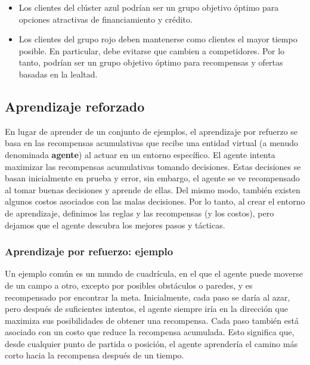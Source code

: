 \documentclass[
]{book}
\providecommand{\tightlist}{%
  \setlength{\itemsep}{0pt}\setlength{\parskip}{0pt}}
\begin{document}
\begin{itemize}
\tightlist
\item
  Los clientes del clúster azul podrían ser un grupo objetivo óptimo para opciones atractivas de financiamiento y crédito.
\item
  Los clientes del grupo rojo deben mantenerse como clientes el mayor tiempo posible. En particular, debe evitarse que cambien a competidores. Por lo tanto, podrían ser un grupo objetivo óptimo para recompensas y ofertas basadas en la lealtad.
\end{itemize}

\hypertarget{aprendizaje-reforzado}{%
\subsection{Aprendizaje reforzado}\label{aprendizaje-reforzado}}

En lugar de aprender de un conjunto de ejemplos, el aprendizaje por refuerzo se basa en las recompensas acumulativas que recibe una entidad virtual (a menudo denominada \textbf{agente}) al actuar en un entorno específico. El agente intenta maximizar las recompensas acumulativas tomando decisiones. Estas decisiones se basan inicialmente en prueba y error, sin embargo, el agente se ve recompensado al tomar buenas decisiones y aprende de ellas. Del mismo modo, también existen algunos costos asociados con las malas decisiones. Por lo tanto, al crear el entorno de aprendizaje, definimos las reglas y las recompensas (y los costos), pero dejamos que el agente descubra los mejores pasos y tácticas.

\hypertarget{aprendizaje-por-refuerzo-ejemplo}{%
\subsubsection{Aprendizaje por refuerzo: ejemplo}\label{aprendizaje-por-refuerzo-ejemplo}}

Un ejemplo común es un mundo de cuadrícula, en el que el agente puede moverse de un campo a otro, excepto por posibles obstáculos o paredes, y es recompensado por encontrar la meta. Inicialmente, cada paso se daría al azar, pero después de suficientes intentos, el agente siempre iría en la dirección que maximiza sus posibilidades de obtener una recompensa. Cada paso también está asociado con un costo que reduce la recompensa acumulada. Esto significa que, desde cualquier punto de partida o posición, el agente aprendería el camino más corto hacia la recompensa después de un tiempo.
\end{document}
